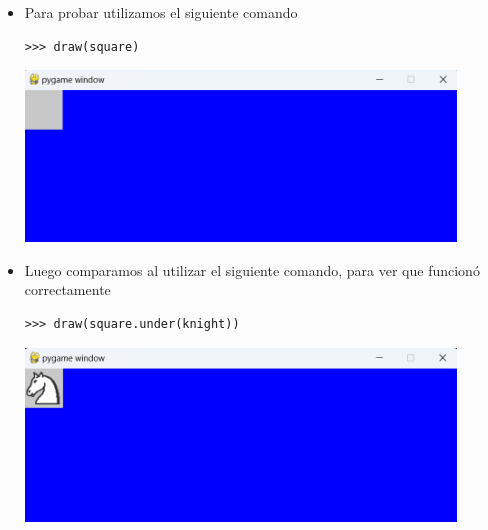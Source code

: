 \documentclass{article}
\begin{document}
\begin{itemize}
    \vspace{\baselineskip}

    \begin{itemize}
      \item Para probar utilizamos el siguiente comando

      \begin{lstlisting}[style=shell]
      >>> draw(square)
      \end{lstlisting}
      \begin{minipage}{\linewidth}
        \centering
        \includegraphics[width=0.9\textwidth]{imagenes/p_under1.png}
      \end{minipage}

      \vspace{2\baselineskip}

      \item Luego comparamos al utilizar el siguiente comando, para ver que funcionó correctamente
      
      \begin{lstlisting}[style=shell]
      >>> draw(square.under(knight))
      \end{lstlisting}

      \begin{minipage}{\linewidth}
        \centering
        \includegraphics[width=0.9\textwidth]{imagenes/p_under2.png}
      \end{minipage}
    \end{itemize}

  \pagebreak


\end{itemize}
\end{document}
